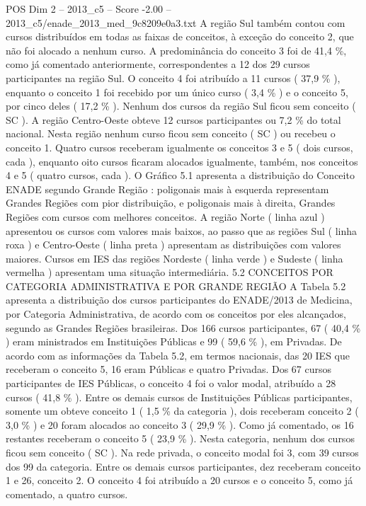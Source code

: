 \begin{textsample}{POS Dim 2 – 2013\_c5 – Score -2.00 – 2013\_c5/enade\_2013\_med\_9c8209e0a3.txt}
A região Sul também contou com cursos distribuídos em todas as faixas de conceitos, à exceção do conceito 2, que não foi alocado a nenhum curso.
A predominância do conceito 3 foi de 41,4 \%, como já comentado anteriormente, correspondentes a 12 dos 29 cursos participantes na região Sul.
O conceito 4 foi atribuído a 11 cursos ( 37,9 \% ), enquanto o conceito 1 foi recebido por um único curso ( 3,4 \% ) e o conceito 5, por cinco deles ( 17,2 \% ).
Nenhum dos cursos da região Sul ficou sem conceito ( SC ).
A região Centro-Oeste obteve 12 cursos participantes ou 7,2 \% do total nacional.
Nesta região nenhum curso ficou sem conceito ( SC ) ou recebeu o conceito 1.
Quatro cursos receberam igualmente os conceitos 3 e 5 ( dois cursos, cada ), enquanto oito cursos ficaram alocados igualmente, também, nos conceitos 4 e 5 ( quatro cursos, cada ).
O Gráfico 5.1 apresenta a distribuição do Conceito ENADE segundo Grande Região : poligonais mais à esquerda representam Grandes Regiões com pior distribuição, e poligonais mais à direita, Grandes Regiões com cursos com melhores conceitos.
A região Norte ( linha azul ) apresentou os cursos com valores mais baixos, ao passo que as regiões Sul ( linha roxa ) e Centro-Oeste ( linha preta ) apresentam as distribuições com valores maiores.
Cursos em IES das regiões Nordeste ( linha verde ) e Sudeste ( linha vermelha ) apresentam uma situação intermediária. 5.2 CONCEITOS POR CATEGORIA ADMINISTRATIVA E POR GRANDE REGIÃO A Tabela 5.2 apresenta a distribuição dos cursos participantes do ENADE/2013 de Medicina, por Categoria Administrativa, de acordo com os conceitos por eles alcançados, segundo as Grandes Regiões brasileiras.
Dos 166 cursos participantes, 67 ( 40,4 \% ) eram ministrados em Instituições Públicas e 99 ( 59,6 \% ), em Privadas.
De acordo com as informações da Tabela 5.2, em termos nacionais, das 20 IES que receberam o conceito 5, 16 eram Públicas e quatro Privadas.
Dos 67 cursos participantes de IES Públicas, o conceito 4 foi o valor modal, atribuído a 28 cursos ( 41,8 \% ).
Entre os demais cursos de Instituições Públicas participantes, somente um obteve conceito 1 ( 1,5 \% da categoria ), dois receberam conceito 2 ( 3,0 \% ) e 20 foram alocados ao conceito 3 ( 29,9 \% ).
Como já comentado, os 16 restantes receberam o conceito 5 ( 23,9 \% ).
Nesta categoria, nenhum dos cursos ficou sem conceito ( SC ).
Na rede privada, o conceito modal foi 3, com 39 cursos dos 99 da categoria.
Entre os demais cursos participantes, dez receberam conceito 1 e 26, conceito 2.
O conceito 4 foi atribuído a 20 cursos e o conceito 5, como já comentado, a quatro cursos.

\end{textsample}
